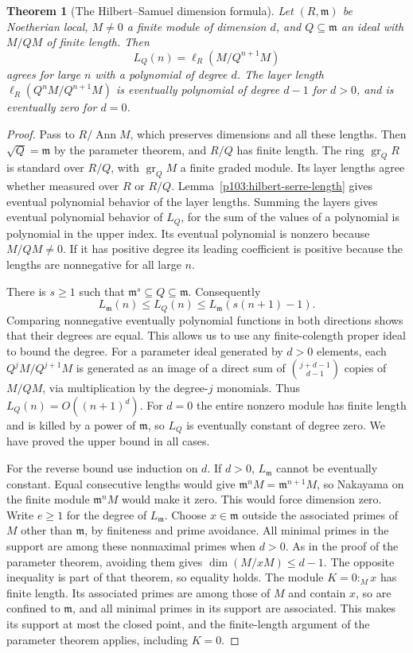 \documentclass[11pt,oneside,openany]{book}
\newtheorem{theorem}{Theorem}[chapter]
\theoremstyle{definition}
\theoremstyle{remark}
\begin{document}
\begin{theorem}[The Hilbert--Samuel dimension formula]\label{p103:ALG-05-C03-S02}
Let \((R,\mathfrak m)\) be Noetherian local, \(M\ne0\) a finite module of dimension \(d\), and \(Q\subseteq\mathfrak m\) an ideal with \(M/QM\) of finite length. Then
\[
 L_Q(n)=\ell_R(M/Q^{n+1}M)
\]
agrees for large \(n\) with a polynomial of degree \(d\). The layer length \(\ell_R(Q^nM/Q^{n+1}M)\) is eventually polynomial of degree \(d-1\) for \(d>0\), and is eventually zero for \(d=0\).
\end{theorem}
\begin{proof}
Pass to \(R/\operatorname{Ann}M\), which preserves dimensions and all these lengths. Then \(\sqrt Q=\mathfrak m\) by the parameter theorem, and \(R/Q\) has finite length. The ring \(\operatorname{gr}_Q R\) is standard over \(R/Q\), with \(\operatorname{gr}_Q M\) a finite graded module. Its layer lengths agree whether measured over \(R\) or \(R/Q\). Lemma~\ref{p103:hilbert-serre-length} gives eventual polynomial behavior of the layer lengths. Summing the layers gives eventual polynomial behavior of \(L_Q\), for the sum of the values of a polynomial is polynomial in the upper index. Its eventual polynomial is nonzero because \(M/QM\ne0\). If it has positive degree its leading coefficient is positive because the lengths are nonnegative for all large \(n\).

There is \(s\ge1\) such that \(\mathfrak m^s\subseteq Q\subseteq\mathfrak m\). Consequently
\[
 L_{\mathfrak m}(n)\le L_Q(n)\le L_{\mathfrak m}(s(n+1)-1).
\]
Comparing nonnegative eventually polynomial functions in both directions shows that their degrees are equal. This allows us to use any finite-colength proper ideal to bound the degree. For a parameter ideal generated by \(d>0\) elements, each \(Q^jM/Q^{j+1}M\) is generated as an image of a direct sum of \(\binom{j+d-1}{d-1}\) copies of \(M/QM\), via multiplication by the degree-\(j\) monomials. Thus \(L_Q(n)=O((n+1)^d)\). For \(d=0\) the entire nonzero module has finite length and is killed by a power of \(\mathfrak m\), so \(L_Q\) is eventually constant of degree zero. We have proved the upper bound in all cases.

For the reverse bound use induction on \(d\). If \(d>0\), \(L_{\mathfrak m}\) cannot be eventually constant. Equal consecutive lengths would give \(\mathfrak m^nM=\mathfrak m^{n+1}M\), so Nakayama on the finite module \(\mathfrak m^nM\) would make it zero. This would force dimension zero. Write \(e\ge1\) for the degree of \(L_{\mathfrak m}\). Choose \(x\in\mathfrak m\) outside the associated primes of \(M\) other than \(\mathfrak m\), by finiteness and prime avoidance. All minimal primes in the support are among these nonmaximal primes when \(d>0\). As in the proof of the parameter theorem, avoiding them gives \(\dim(M/xM)\le d-1\). The opposite inequality is part of that theorem, so equality holds. The module \(K=0:_M x\) has finite length. Its associated primes are among those of \(M\) and contain \(x\), so are confined to \(\mathfrak m\), and all minimal primes in its support are associated. This makes its support at most the closed point, and the finite-length argument of the parameter theorem applies, including \(K=0\).


\end{proof}
\end{document}
